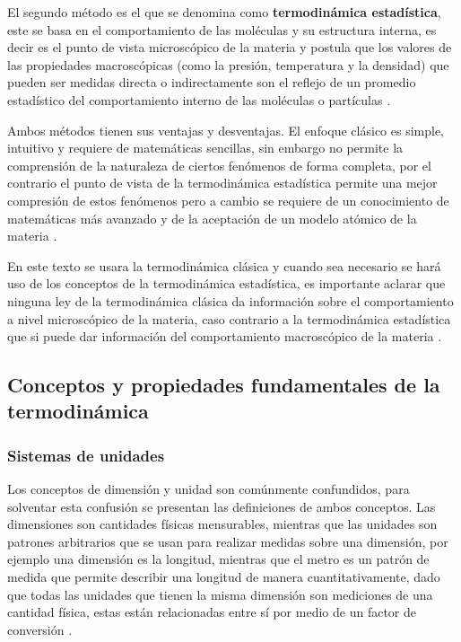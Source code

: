 \documentclass[master.tex]{subfiles}
\begin{document}
    El segundo método es el que se denomina como \textbf{termodinámica estadística}, este se basa en el comportamiento de las moléculas y su estructura interna, es decir es el punto de vista microscópico de la materia y postula que los valores de las propiedades macroscópicas (como la presión, temperatura y la densidad) que pueden ser medidas directa o indirectamente son el reflejo de un promedio estadístico del comportamiento interno de las moléculas o partículas \parencites{faires}{wark}.

    Ambos métodos tienen sus ventajas y desventajas. El enfoque clásico es simple, intuitivo y requiere de matemáticas sencillas, sin embargo no permite la comprensión de la naturaleza de ciertos fenómenos de forma completa, por el contrario el punto de vista de la termodinámica estadística permite una mejor compresión de estos fenómenos pero a cambio se requiere de un conocimiento de matemáticas más avanzado y de la aceptación de un modelo atómico de la materia \parencite{faires}. 

    En este texto se usara la termodinámica clásica y cuando sea necesario se hará uso de los conceptos de la termodinámica estadística, es importante aclarar que ninguna ley de la termodinámica clásica da información sobre el comportamiento a nivel microscópico de la materia, caso contrario a la termodinámica estadística que si puede dar información del comportamiento macroscópico de la materia \parencite{smith-vanness}.

    \subsection{Conceptos y propiedades fundamentales de la termodinámica}

    \subsubsection{Sistemas de unidades}

    Los conceptos de dimensión y unidad son comúnmente confundidos, para solventar esta confusión se presentan las definiciones de ambos conceptos. Las dimensiones son cantidades físicas mensurables, mientras que las unidades son patrones arbitrarios que se usan para realizar medidas sobre una dimensión, por ejemplo una dimensión es la longitud, mientras que el metro es un patrón de medida que permite describir una longitud de manera cuantitativamente, dado que todas las unidades que tienen la misma dimensión son mediciones de una cantidad física, estas están relacionadas entre sí por medio de un factor de conversión  \parencites{rubenstein}{doran}.
\end{document}
